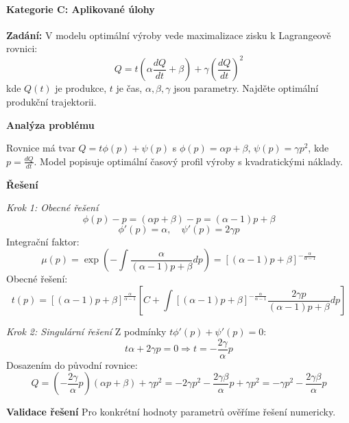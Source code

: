     \paragraph*{Kategorie C: Aplikované úlohy}

\begin{example}
\label{ex:optimalni-vyroba}

\noindent\textbf{Zadání:} V modelu optimální výroby vede maximalizace zisku k Lagrangeově rovnici:
\[
Q = t\left(\alpha \frac{dQ}{dt} + \beta\right) + \gamma \left(\frac{dQ}{dt}\right)^2
\]
kde $Q(t)$ je produkce, $t$ je čas, $\alpha, \beta, \gamma$ jsou parametry. Najděte optimální produkční trajektorii.

\vspace{1.5\baselineskip}

\noindent\textbf{Analýza problému}

Rovnice má tvar $Q = t\phi(p) + \psi(p)$ s $\phi(p) = \alpha p + \beta$, $\psi(p) = \gamma p^2$, kde $p = \frac{dQ}{dt}$. Model popisuje optimální časový profil výroby s kvadratickými náklady.

\vspace{1.5\baselineskip}

\noindent\textbf{Řešení}

\noindent\textit{Krok 1: Obecné řešení}
\[
\phi(p) - p = (\alpha p + \beta) - p = (\alpha - 1)p + \beta
\]
\[
\phi'(p) = \alpha, \quad \psi'(p) = 2\gamma p
\]
Integrační faktor:
\[
\mu(p) = \exp\left(-\int \frac{\alpha}{(\alpha-1)p + \beta} dp\right) = [(\alpha-1)p + \beta]^{-\frac{\alpha}{\alpha-1}}
\]
Obecné řešení:
\[
t(p) = [(\alpha-1)p + \beta]^{\frac{\alpha}{\alpha-1}} \left[ C + \int [(\alpha-1)p + \beta]^{-\frac{\alpha}{\alpha-1}} \frac{2\gamma p}{(\alpha-1)p + \beta} dp \right]
\]

\vspace{1\baselineskip}

\noindent\textit{Krok 2: Singulární řešení}
Z podmínky $t\phi'(p) + \psi'(p) = 0$:
\[
t\alpha + 2\gamma p = 0 \Rightarrow t = -\frac{2\gamma}{\alpha}p
\]
Dosazením do původní rovnice:
\[
Q = \left(-\frac{2\gamma}{\alpha}p\right)(\alpha p + \beta) + \gamma p^2 = -2\gamma p^2 - \frac{2\gamma\beta}{\alpha}p + \gamma p^2 = -\gamma p^2 - \frac{2\gamma\beta}{\alpha}p
\]

\vspace{1.5\baselineskip}

\noindent\textbf{Validace řešení}
Pro konkrétní hodnoty parametrů ověříme řešení numericky.


\end{example}
